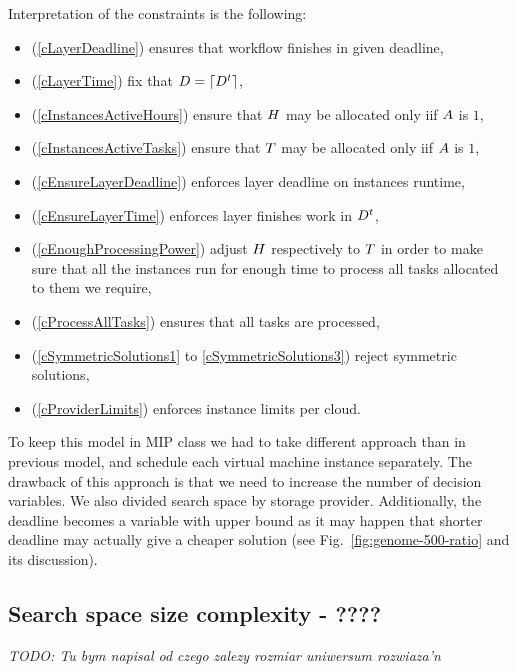 {    Interpretation of the constraints is the following:
    \begin{itemize}
        \item(\ref{cLayerDeadline}) ensures that workflow finishes in given deadline,
        \item(\ref{cLayerTime}) fix that $D = \lceil D^t\rceil$,
        \item(\ref{cInstancesActiveHours}) ensure that $H$ may be allocated only iif $A$ is $1$,
        \item(\ref{cInstancesActiveTasks}) ensure that $T$ may be allocated only iif $A$ is $1$,
        \item(\ref{cEnsureLayerDeadline}) enforces layer deadline on instances runtime,
        \item(\ref{cEnsureLayerTime}) enforces layer finishes work in $D^t$,
        \item(\ref{cEnoughProcessingPower}) adjust $H$ respectively to $T$ in order to make sure that all the instances run for enough time to process all tasks allocated to them we require,
        \item(\ref{cProcessAllTasks}) ensures that all tasks are processed,
        \item(\ref{cSymmetricSolutions1} to \ref{cSymmetricSolutions3}) reject symmetric solutions,
        \item(\ref{cProviderLimits}) enforces instance limits per cloud.
    \end{itemize}
    
    To keep this model in MIP class we had to take different approach than in previous model, 
    and schedule each virtual machine instance separately. The drawback of this approach is that we need
    to increase the number of decision variables. We also divided search space by storage provider.
    Additionally, the deadline becomes a variable with upper bound as it may happen that shorter deadline
    may actually give a cheaper solution (see Fig.~\ref{fig:genome-500-ratio} and its discussion).
    

    
    \subsection{Search space size complexity - ????}

    \emph{TODO: Tu bym napisal od czego zalezy rozmiar uniwersum rozwiaza'n}

}
